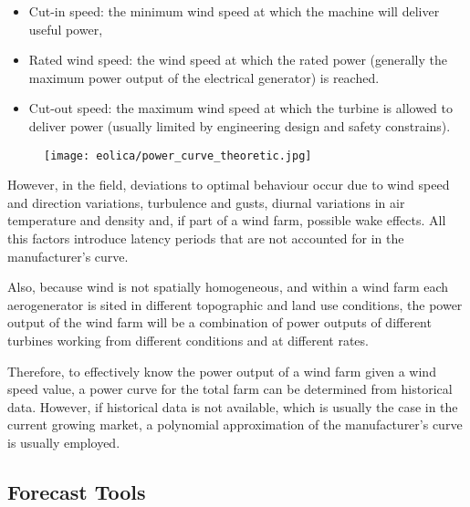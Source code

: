 \begin{itemize}
    \item Cut-in speed: the minimum wind speed at which the machine will deliver useful power,
    \item Rated wind speed: the wind speed at which the rated power (generally the maximum power output of the electrical generator) is reached.
    \item Cut-out speed: the maximum wind speed at which the turbine is allowed to deliver power (usually limited by engineering design and safety constrains).
\end{itemize}

\begin{figure}[!htp]
    \centering
    \texttt{[image: eolica/power\_curve\_theoretic.jpg]}   
    \label{fig:powercurve_theo}
\end{figure}
\FloatBarrier

However, in the field, deviations to optimal behaviour occur due to wind speed and direction variations, turbulence and gusts, diurnal variations in air temperature and density and, if part of a wind farm, possible wake effects. All this factors introduce latency periods that are not accounted for in the manufacturer's curve. 

Also, because wind is not spatially homogeneous, and within a wind farm each aerogenerator is sited in different topographic and land use conditions, the power output of the wind farm will be a combination of power outputs of different turbines working from different conditions and at different rates. 

Therefore, to effectively know the power output of a wind farm given a wind speed value, a power curve for the total farm can be determined from historical data. However, if historical data is not available, which is usually the case in the current growing market, a polynomial approximation of the manufacturer's curve is usually employed. 

\FloatBarrier
\subsection{Forecast Tools}

